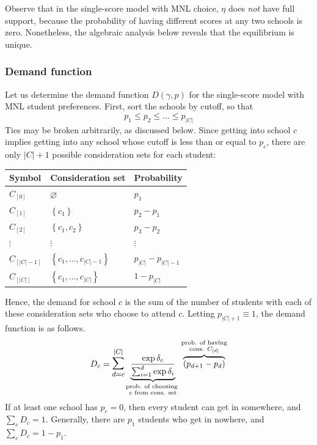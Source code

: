 \documentclass[12pt]{article}
\theoremstyle{definition}
\begin{document}
Observe that in the single-score model with MNL choice, $\eta$ does \emph{not} have full support, because the probability of having different scores at any two schools is zero. Nonetheless, the algebraic analysis below reveals that the equilibrium is unique.

\subsubsection{Demand function}
Let us determine the demand function $D(\gamma, p)$ for the single-score model with MNL student preferences. First, sort the schools by cutoff, so that
\[p_1 \leq p_2 \leq \dots \leq p_{|C|}\]
Ties may be broken arbitrarily, as discussed below. Since getting into school $c$ implies getting into any school whose cutoff is less than or equal to $p_c$, there are only $|C| + 1$ possible consideration sets for each student: 
\begin{center}
\begin{tabular}{lll}
\textbf{Symbol} & \textbf{Consideration set} & \textbf{Probability} \\ \hline
$C_{[0]}$    & $\varnothing$    & $p_1$                  \\
$C_{[1]}$    & $\left\{ c_1 \right\}$    & $p_2 - p_1$               \\
$C_{[2]}$    & $\left\{ c_1, c_2 \right\}$    & $p_3 - p_2$               \\
$\vdots$ & $\vdots$ & $\vdots$ \\
$C_{[|C| - 1]}$           & $\left\{ c_1, \dots, c_{|C| - 1} \right\}$     & $p_{|C|} - p_{|C|-1}$             \\
$C_{[|C|]}$           & $\left\{ c_1, \dots, c_{|C|} \right\}$     & $1 - p_{|C|}$                 
\end{tabular}
\end{center}
Hence, the demand for school $c$ is the sum of the number of students with each of these consideration sets who choose to attend $c$. Letting $p_{|C|+1} \equiv 1$, the demand function is as follows.
\begin{equation}D_c = \mathlarger{\mathlarger{\sum}}_{d=c}^{|C|} 
\underbrace{\frac{\exp{\delta_c}}{ \sum_{i=1}^d \exp{\delta_i}}}_{\substack{\text{prob. of choosing  }\\ c\text{ from cons. set}}} 
\overbrace{\left(p_{d+1} - p_{d}\right)}^{\substack{\text{prob. of having}\\ \text{cons. }C_{[d]}}} 
\label{mnlonetestdemand}\end{equation}
If at least one school has $p_c = 0$, then every student can get in somewhere, and $\sum_c D_c = 1$. Generally, there are $p_1$ students who get in nowhere, and $\sum_c D_c = 1 - p_1$.
\end{document}
